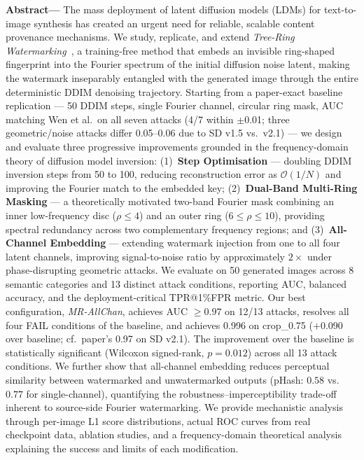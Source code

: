 \documentclass[10pt,twocolumn]{article}
\begin{document}
\noindent\textbf{Abstract---}
The mass deployment of latent diffusion models (LDMs) for text-to-image
synthesis has created an urgent need for reliable, scalable content
provenance mechanisms.
We study, replicate, and extend
\emph{Tree-Ring Watermarking}~\cite{wen2023treering},
a training-free method that embeds an invisible ring-shaped fingerprint
into the Fourier spectrum of the initial diffusion noise latent,
making the watermark inseparably entangled with the generated image
through the entire deterministic DDIM denoising trajectory.
Starting from a paper-exact baseline replication --- 50 DDIM steps,
single Fourier channel, circular ring mask, AUC matching Wen et al.\
on all seven attacks (4/7 within $\pm$0.01; three geometric/noise
attacks differ 0.05--0.06 due to SD v1.5 vs.\ v2.1) --- we design and evaluate
three progressive improvements grounded in the frequency-domain
theory of diffusion model inversion:
(1)~\textbf{Step Optimisation} --- doubling DDIM inversion steps
from 50 to 100, reducing reconstruction error as $\mathcal{O}(1/N)$
and improving the Fourier match to the embedded key;
(2)~\textbf{Dual-Band Multi-Ring Masking} --- a theoretically motivated
two-band Fourier mask combining an inner low-frequency disc
($\rho \le 4$) and an outer ring ($6 \le \rho \le 10$), providing
spectral redundancy across two complementary frequency regions;
and (3)~\textbf{All-Channel Embedding} --- extending watermark injection
from one to all four latent channels, improving signal-to-noise ratio
by approximately $2\times$ under phase-disrupting geometric attacks.
We evaluate on 50 generated images across 8 semantic categories
and 13 distinct attack conditions, reporting AUC, balanced accuracy,
and the deployment-critical TPR@1\%FPR metric.
Our best configuration, \emph{MR-AllChan}, achieves AUC $\geq 0.97$
on 12/13 attacks, resolves all four FAIL conditions of the baseline,
and achieves 0.996 on crop\_0.75 ($+$0.090 over baseline; cf.\ paper's 0.97 on SD v2.1).
The improvement over the baseline is statistically significant
(Wilcoxon signed-rank, $p{=}0.012$) across all 13 attack conditions.
We further show that all-channel embedding reduces perceptual similarity
between watermarked and unwatermarked outputs (pHash: $0.58$ vs.\ $0.77$
for single-channel), quantifying the robustness--imperceptibility
trade-off inherent to source-side Fourier watermarking.
We provide mechanistic analysis through per-image L1 score distributions,
actual ROC curves from real checkpoint data, ablation studies, and a
frequency-domain theoretical analysis explaining the success and limits
of each modification.
\end{document}
